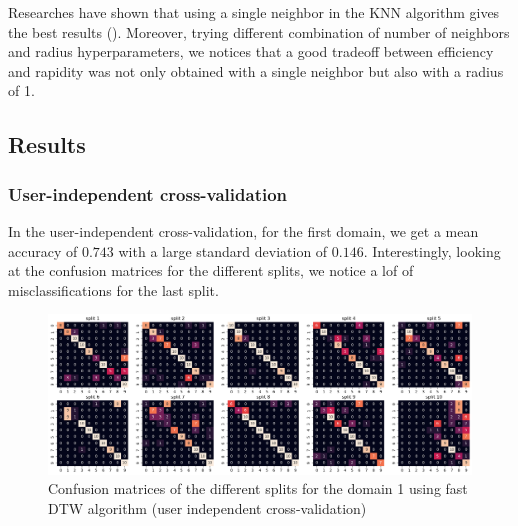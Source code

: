 Researches have shown that using a single neighbor in the KNN algorithm gives the best results (\cite{Mitsa_2010}). Moreover, trying different combination of number of neighbors and radius hyperparameters, we notices that a good tradeoff between efficiency and rapidity was not only obtained with a single neighbor but also with a radius of 1.



\subsection{Results}

\subsubsection{User-independent cross-validation}

In the user-independent cross-validation, for the first domain, we get a mean accuracy of $0.743$ with a large standard deviation of $0.146$. Interestingly, looking at the confusion matrices for the different splits, we notice a lof of misclassifications for the last split.

\begin{figure}[H]
	\centering
	\includegraphics{figures/dtw/domain01/cm_dtw_d1_uindep.png}
	\caption{Confusion matrices of the different splits for the domain 1 using fast DTW algorithm (user independent cross-validation)}
	\label{fig:cm-dtw-d1-uindep}
\end{figure}

